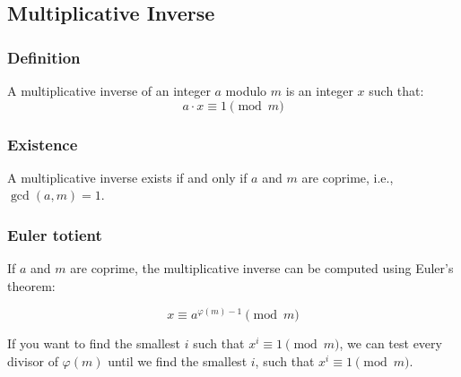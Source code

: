 
\subsection{Multiplicative Inverse}

\subsubsection{Definition}

A multiplicative inverse of an integer \( a \) modulo \( m \) is an integer \( x \) such that:
\[
a \cdot x \equiv 1 \pmod{m}
\]

\subsubsection{Existence}

A multiplicative inverse exists if and only if \( a \) and \( m \) are coprime, i.e., \( \gcd(a, m) = 1 \).

\subsubsection{Euler totient}
If \( a \) and \( m \) are coprime, the multiplicative inverse
can be computed using Euler's theorem:

\[
x \equiv a^{\varphi(m) - 1} \pmod{m}
\]

If you want to find the smallest $i$ such that $x^i \equiv 1 \pmod{m}$, we can test every divisor of \( \varphi(m) \) until we find the smallest \( i \), such that \( x^i \equiv 1 \pmod{m} \).

